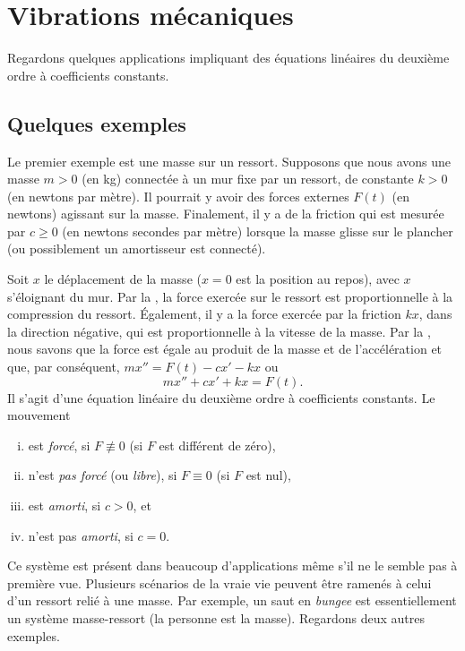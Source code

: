 \sectionnewpage
\section{Vibrations mécaniques} \label{sec:mv}


Regardons quelques applications impliquant des équations linéaires du deuxième ordre à coefficients constants. 
\subsection{Quelques exemples}

\begin{mywrapfigsimp}{2.0in}{2.3in}
\noindent
{}
\end{mywrapfigsimp}
Le premier exemple est une masse sur un ressort. Supposons que nous avons une masse $m > 0$ (en kg) connectée à un mur fixe par un ressort, de constante $k > 0$ (en newtons par mètre). Il pourrait y avoir des forces externes  $F(t)$ (en newtons) agissant sur la masse. Finalement, il y a de la friction qui est mesurée par $c \geq 0$ (en newtons secondes par mètre) lorsque la masse glisse sur le plancher (ou possiblement un amortisseur est connecté). 

Soit $x$ le déplacement de la masse  ($x=0$ est la position au repos), avec
$x$ s'éloignant du mur.  
Par la , la force exercée sur le ressort est proportionnelle à la compression du ressort.
Également, il y a  la force exercée par la friction $kx$, dans la direction négative, qui est proportionnelle à la vitesse de la masse.
Par la , nous savons que la force est égale au produit de la masse et de l'accélération et que, par conséquent, $mx'' = F(t)-cx'-kx$ ou
\begin{equation*}
mx'' + cx' + kx = F(t) .
\end{equation*}
Il s'agit d'une équation linéaire du deuxième ordre à coefficients constants. Le mouvement  
%
\begin{enumerate}[(i)]
\item  est \emph{forcé}, si $F \not\equiv 0$ (si $F$ est différent de zéro),
\item n'est \emph{pas forcé} (ou \emph{libre}), si $F \equiv 0$ (si $F$ est nul),
\item est \emph{amorti}, si $c > 0$, et
\item n'est pas \emph{amorti}, si $c = 0$.
\end{enumerate}
%
Ce système est présent dans beaucoup d'applications même s'il ne le semble pas à première vue. Plusieurs scénarios de la vraie vie peuvent être ramenés à celui d'un ressort relié à une masse. Par exemple, un saut en \emph{bungee} est essentiellement un système masse-ressort (la personne est la masse).  Regardons deux autres exemples.  

